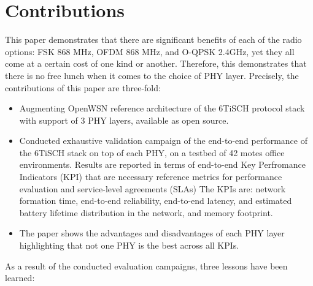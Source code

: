 \documentclass[journal]{IEEEtran}
\newcommand{\fsk}          {FSK 868 MHz}
\newcommand{\oqpsk}        {O-QPSK 2.4GHz}
\newcommand{\ofdm}         {OFDM 868 MHz}
\begin{document}
\section{Contributions}
\label{sec:contributions}

This paper demonstrates that there are significant benefits of each of the radio options: \fsk, \ofdm, and \oqpsk, yet they all come at a certain cost of one kind or another.
Therefore, this demonstrates that there is no free lunch when it comes to the choice of PHY layer.
Precisely, the contributions of this paper are three-fold:

%
\begin{itemize}
    \item Augmenting OpenWSN reference architecture of the 6TiSCH protocol stack with support of 3 PHY layers, available as open source.
    \item Conducted exhaustive validation campaign of the end-to-end performance of the 6TiSCH stack on top of each PHY, on a testbed of 42 motes office environments.
    Results are reported in terms of end-to-end Key Perfromance Indicators (KPI) that are necessary reference metrics for performance evaluation and service-level agreements (SLAs)
    The KPIs are: 
        network formation time,
        end-to-end reliability,
        end-to-end latency, and
        estimated battery lifetime distribution in the network,
        and memory footprint.
    \item The paper shows the advantages and disadvantages of each PHY layer highlighting that not one PHY is the best across all KPIs.
\end{itemize}

As a result of the conducted evaluation campaigns, three lessons have been learned:
\end{document}
